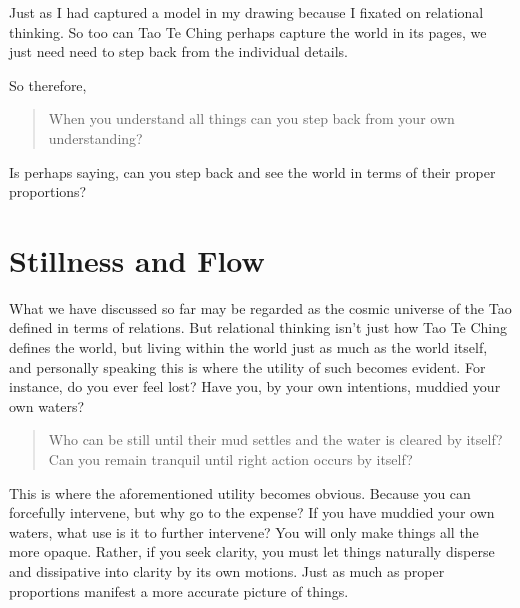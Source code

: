Just as I had captured a model in my drawing because I fixated on relational thinking. So too can Tao Te Ching perhaps capture the world in its pages, we just need need to step back from the individual details. 

So therefore, 
\begin{verse}
When you understand all things can you step back from your own understanding?\\
\end{verse}
Is perhaps saying, can you step back and see the world in terms of their proper proportions? 


\section{Stillness and Flow}

What we have discussed so far may be regarded as the cosmic universe of the Tao defined in terms of relations. But relational thinking isn’t just how Tao Te Ching defines the world, but living within the world just as much as the world itself, and personally speaking this is where the utility of such becomes evident. For instance, do you ever feel lost? Have you, by your own intentions, muddied your own waters?

\begin{verse}
Who can be still until their mud settles and the water is cleared by itself?\\
Can you remain tranquil until right action occurs by itself?\\
\end{verse}

This is where the aforementioned utility becomes obvious. Because you can forcefully intervene, but why go to the expense? If you have muddied your own waters, what use is it to further intervene? You will only make things all the more opaque. Rather, if you seek clarity, you must let things naturally disperse and dissipative into clarity by its own motions. Just as much as proper proportions manifest a more accurate picture of things. 

